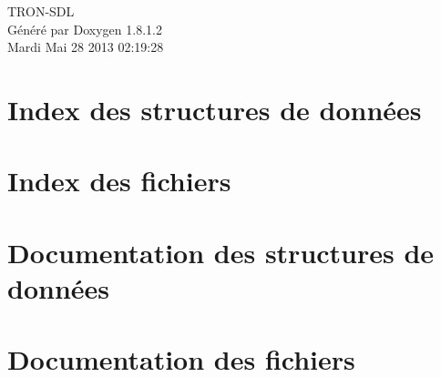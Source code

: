 \documentclass{book}
\begin{document}
\hypersetup{pageanchor=false,citecolor=blue}
\begin{titlepage}
\vspace*{7cm}
\begin{center}
{\Large T\-R\-O\-N-\/\-S\-D\-L }\\
\vspace*{1cm}
{\large Généré par Doxygen 1.8.1.2}\\
\vspace*{0.5cm}
{\small Mardi Mai 28 2013 02:19:28}\\
\end{center}
\end{titlepage}
\clearemptydoublepage
{}
\tableofcontents
\clearemptydoublepage
{}
\hypersetup{pageanchor=true,citecolor=blue}
\chapter{Index des structures de données}

\chapter{Index des fichiers}

\chapter{Documentation des structures de données}












\chapter{Documentation des fichiers}




























\printindex
\end{document}
